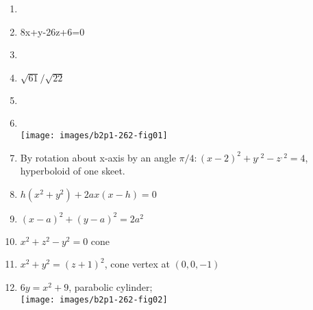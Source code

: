 \documentclass[11pt]{amsbook}
\begin{document}
\begin{enumerate}[label=\arabic*.]
\addtocounter{enumi}{1}
	\item 
		\begin{enumerate}[label=\alph*)]
		\end{enumerate}
\addtocounter{enumi}{1}
	\item 
		8x+y-26z+6=0
\addtocounter{enumi}{1}
	\item 
		\begin{enumerate}[label=\alph*)]
		\end{enumerate}		
\addtocounter{enumi}{1}
	\item 
		$\sqrt{61}/\sqrt{22}$
\addtocounter{enumi}{1}
	\item 
		\begin{enumerate}[label=\alph*)]
		\end{enumerate}		
\addtocounter{enumi}{1}
	\item ~\\
		 \texttt{[image: images/b2p1-262-fig01]}

\addtocounter{enumi}{1}
	\item
		By rotation about x-axis by an angle $\pi/4: (x-2)^2+y^{,2}-z^{,2}=4$, hyperboloid of one skeet.

\addtocounter{enumi}{1}
	\item
		$h(x^2+y^2)+2ax(x-h)=0$

\addtocounter{enumi}{1}
	\item
		$(x-a)^2+(y-a)^2=2a^2$

\addtocounter{enumi}{1}
	\item
		$x^2+z^2-y^2=0$ cone

\addtocounter{enumi}{1}
	\item
		$x^2+y^2=(z+1)^2$, cone vertex at $(0,0,-1)$

\addtocounter{enumi}{1}
	\item
		$6y=x^2+9$, parabolic cylinder; \\
		 \texttt{[image: images/b2p1-262-fig02]}

\end{enumerate}

\end{document}
